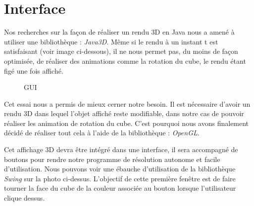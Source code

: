 \chapter{Interface}
Nos recherches sur la façon de réaliser un rendu 3D en Java nous a amené à utiliser une bibliothèque : \textit{Java3D}. 
Même si le rendu à un instant t est satisfaisant (voir image ci-dessous), il ne nous permet pas, du moins de façon optimisée, de réaliser des animations comme la rotation du cube, le rendu étant figé une fois affiché.
\begin{figure}[h]
\begin{center}
\end{center}
\caption{GUI}
\end{figure}
Cet essai nous a permis de mieux cerner notre besoin. 
Il est nécessaire d'avoir un rendu 3D dans lequel l'objet affiché reste modifiable, dans notre cas de pouvoir réaliser les animation de rotation du cube. C'est pourquoi nous avons finalement décidé de réaliser tout cela à l'aide de la bibliothèque : \textit{OpenGL}.

Cet affichage 3D devra être intégré dans une interface, il sera accompagné de boutons pour rendre notre programme de résolution autonome et facile d'utilisation. Nous pouvons voir une ébauche d'utilisation de la bibliothèque \textit{Swing} sur la photo ci-dessus. L'objectif de cette première fenêtre est de faire tourner la face du cube de la couleur associée au bouton lorsque l'utilisateur clique dessus.

